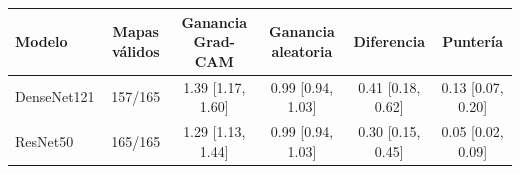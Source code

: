 \begin{tabular}{lccccc}
\toprule
Modelo & Mapas válidos & Ganancia Grad-CAM & Ganancia aleatoria & Diferencia & Puntería \\
\midrule
DenseNet121 & 157/165 & 1.39 [1.17, 1.60] & 0.99 [0.94, 1.03] & 0.41 [0.18, 0.62] & 0.13 [0.07, 0.20] \\
ResNet50 & 165/165 & 1.29 [1.13, 1.44] & 0.99 [0.94, 1.03] & 0.30 [0.15, 0.45] & 0.05 [0.02, 0.09] \\
\bottomrule
\end{tabular}
